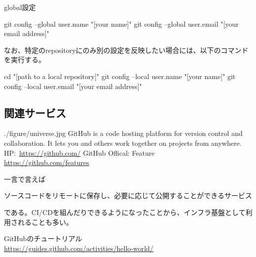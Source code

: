 \documentclass[11pt,a4paper,openany,dvipdfmx]{jsarticle}
\begin{document}
global設定
\begin{commandshell}
git config --global user.name "[your name]"
git config --global user.email "[your email address]"
\end{commandshell}

なお、特定のrepositoryにのみ別の設定を反映したい場合には、以下のコマンドを実行する。
\begin{commandshell}
cd "[path to a local repository]"
git config --local user.name "[your name]"
git config --local user.email "[your email address]"
\end{commandshell}



\subsection{関連サービス} %
\label{sub:関連サービス}


\begin{picturebox}[title=GitHubについて]{./figure/universe.jpg}
GitHub is a code hosting platform for version control and collaboration. It lets you and others work together on projects from anywhere.\\
HP:\ \url{https://github.com/}
\tcblower
GitHub Offical: Feature\\
\url{https://github.com/features}
\end{picturebox}

一言で言えば
\begin{tcolorbox}[enhanced, fuzzy halo=0.5mm with Gray, frame style image=blueshade.png]
ソースコードをリモートに保存し、必要に応じて公開することができるサービス
\end{tcolorbox}
である。CI/CDを組んだりできるようになったことから、インフラ基盤として利用されることも多い。


GitHubのチュートリアル\\
\url{https://guides.github.com/activities/hello-world/}


\end{document}

